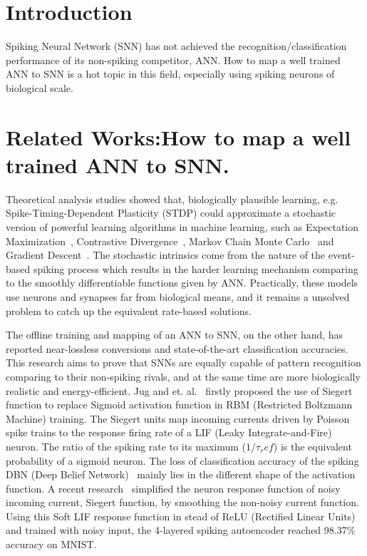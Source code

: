 \documentclass[runningheads,a4paper]{llncs}
\begin{document}
\section{Introduction}
Spiking Neural Network (SNN) has not achieved the recognition/classification performance of its non-spiking competitor, ANN.
How to map a well trained ANN to SNN is a hot topic in this field, especially using spiking neurons of biological scale.
\section{Related Works:How to map a well trained ANN to SNN.}
Theoretical analysis studies showed that, biologically plausible learning, e.g. Spike-Timing-Dependent Plasticity (STDP) could approximate a stochastic version of powerful learning algorithms in machine learning, such as Expectation Maximization~\cite{nessler2013bayesian}, Contrastive Divergence~\cite{neftci2013event}, Markov Chain Monte Carlo~\cite{buesing2011neural} and Gradient Descent~\cite{o2016deep}.
The stochastic intrinsics come from the nature of the event-based spiking process which results in the harder learning mechanism comparing to the smoothly differentiable functions given by ANN.
Practically, these models use neurons and synapses far from biological means, and it remains a unsolved problem to catch up the equivalent rate-based solutions.
 
The offline training and mapping of an ANN to SNN, on the other hand, has reported 
near-lossless conversions and state-of-the-art classification accuracies.
This research aims to prove that SNNs are equally capable of pattern recognition comparing to their non-spiking rivals, and at the same time are more biologically realistic and energy-efficient.
Jug and et. al.~\cite{Jug_etal_2012} firstly proposed the use of Siegert function to replace Sigmoid activation function in RBM (Restricted Boltzmann Machine) training.
The Siegert units map incoming currents driven by Poisson spike trains to the response firing rate of a LIF (Leaky Integrate-and-Fire) neuron.
The ratio of the spiking rate to its maximum ($1/\tau_ref$) is the equivalent probability of a sigmoid neuron.
The loss of classification accuracy of the spiking DBN (Deep Belief Network)~\cite{o2013real} mainly lies in the different shape of the activation function.
A recent research~\cite{hunsberger2015spiking} simplified the neuron response function of noisy incoming current, Siegert function, by smoothing the non-noisy current function.
Using this Soft LIF response function in stead of ReLU (Rectified Linear Units) and trained with noisy input, the 4-layered spiking autoencoder reached 98.37\% accuracy on MNIST. 
\end{document}
